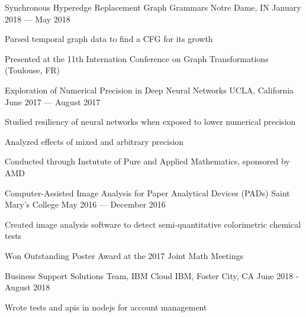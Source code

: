 \begin{cventries}
  {Synchronous Hyperedge Replacement Graph Grammars}
  {Notre Dame, IN}
  {January 2018 --- May 2018}
  {\begin{cvitems}
    \item Parsed temporal graph data to find a CFG for its growth
    \item Presented at the 11th Internation Conference on Graph Transformations
      (Toulouse, FR)
    \end{cvitems}
  }
  {Exploration of Numerical Precision in Deep Neural Networks}
  {UCLA, California}
  {June 2017 --- August 2017}
  {\begin{cvitems}
    \item Studied resiliency of neural networks when exposed to lower numerical precision
    \item Analyzed effects of mixed and arbitrary precision
    \item Conducted through Instutute of Pure and Applied Mathematics, sponsored by AMD
    \end{cvitems}
  }
  {Computer-Assisted Image Analysis for Paper Analytical Devices (PADs)}
  {Saint Mary's College}
  {May 2016 --- December 2016}
  {\begin{cvitems}
    \item {Created image analysis software to detect semi-quantitative colorimetric chemical tests}
    \item {Won Outstanding Poster Award at the 2017 Joint Math Meetings}
    \end{cvitems}
  }
\end{cventries}

\begin{cventries}
  {Business Support Solutions Team, IBM Cloud}
  {IBM, Foster City, CA}
  {June 2018 - August 2018}
  {\begin{cvitems}
  \item Wrote tests and apis in nodejs for account management
  \end{cvitems}}
\end{cventries}
